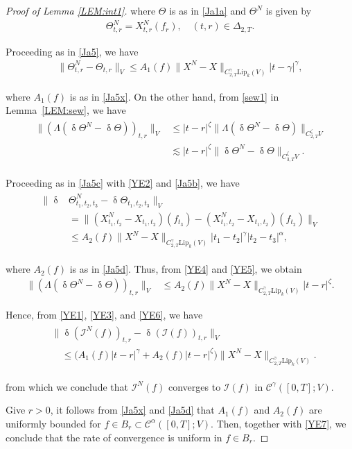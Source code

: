 \documentclass[letterpaper, 11pt,  reqno]{amsart}
\newcommand{\1}{\hspace{0.5mm}\text{I}\hspace{0.5mm}}
\newcommand{\I}{\mathcal{I}}
\newcommand{\noi}{\noindent}
\newcommand{\CC}{\mathcal{C}}
\newcommand{\al}{\alpha}
\newcommand{\updl}{\updelta}
\newcommand{\Dl}{\Delta}
\newcommand{\g}{\gamma}
\newcommand{\les}{\lesssim}
\newcommand{\Lip}{\mathrm{Lip}}
\newcommand{\z}{\zeta}
\newcommand{\Ta}{\Theta}
\numberwithin{equation}{section}
\numberwithin{theorem}{section}
\begin{document}
\begin{proof}[Proof of Lemma \ref{LEM:int1}]
\noi
where $\Ta$ is as in \eqref{Ja1a} and $\Ta^N$ is  given by 
\begin{align}
\Theta_{t,r}^N = X^N_{t,r}(f_r), 
  \quad (t,r)\in \Dl_{2,T}.
\label{YE2}
\end{align}


Proceeding as in \eqref{Ja5}, 
we have
\begin{align}
\| \Ta_{t, r}^N - \Ta_{t, r}\|_{V} 
\le A_1(f) \|X^N - X\|_{C^\g_{2,T}\Lip_k(V)}|t - \g|^\g, 
\label{YE3}
\end{align}

\noi
where $A_1(f)$ is as in \eqref{Ja5x}.
On the other hand, 
 from \eqref{sew1} in  Lemma~\ref{LEM:sew}, we have 
\begin{align}
\begin{split}
\|(\Lambda (\updl \Theta^N - \updl \Ta))_{t,r}\|_{V}
& \le 
|t-r|^{\z}
\|\Lambda (\updl \Theta^N - \updl \Ta)\|_{C^\z_{2,T} V}\\
& \les
|t-r|^{\z}
\| \updl \Theta^N - \updl \Ta\|_{C^\z_{3,T} V}.
\end{split}
\label{YE4}
\end{align}


\noi
Proceeding as in \eqref{Ja5c}
with  \eqref{YE2}
and \eqref{Ja5b}, 
we have 
\begin{align}
\label{YE5}
\begin{aligned}
 \|  \updl & \Theta^N_{t_1, t_2, t_3} - \updl \Ta_{t_1,t_2,t_3}\|_{V}\\
& = \big\|
(X^N_{t_1,t_2} - X_{t_1,t_2}) (f_{t_3}) - (X^N_{t_1,t_2}- X_{t_1,t_2})(f_{t_2})
\big\|_{V}\\
 & \le A_2(f)
 \|X^N - X\|_{C^\g_{2,T}\Lip_k(V)}|t_1 - t_2|^\g 
 |t_2- t_3|^\al, 
\end{aligned}
\end{align}

\noi
where $A_2(f)$ is as in 
\eqref{Ja5d}.
Thus, from \eqref{YE4} and \eqref{YE5}, we obtain
\begin{align}
\|(\Lambda (\updl \Theta^N - \updl \Ta))_{t,r}\|_{V}
& \le 
 A_2(f)
 \|X^N - X\|_{C^\g_{2,T}\Lip_k(V)}
|t-r|^{\z}.
\label{YE6}
\end{align}


Hence, from \eqref{YE1}, \eqref{YE3}, and \eqref{YE6}, we have
\begin{align}
\begin{split}
& \|\updl (\I^N(f))_{t, r} - \updl (\I(f))_{t, r}\|_{V}  \\
& \quad \le 
\Big( A_1(f) |t - r|^\g
+  A_2(f)
|t-r|^{\z}\Big)
\|X^N - X\|_{C^\g_{2,T}\Lip_k(V)}.
\end{split}
\label{YE7}
\end{align}

\noi
from which 
we conclude 
that $\I^N(f)$ converges
to $\I(f)$ in $\CC^\g([0, T]; V)$.

Give $r > 0$, it follows from \eqref{Ja5x}
and 
\eqref{Ja5d}
that 
$A_1(f)$ and $A_2(f)$
are uniformly bounded
for $f \in B_r\subset \CC^{\al}([0,T];V)$.
Then, together with \eqref{YE7}, 
we conclude that  
the rate of convergence is
uniform in $f \in B_r$.  
\end{proof}
\end{document}
